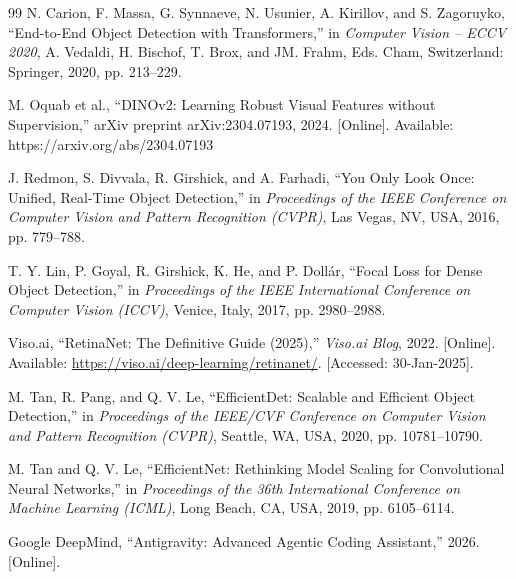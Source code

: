 \documentclass{article}
\begin{document}
\begin{thebibliography}{99}
    N. Carion, F. Massa, G. Synnaeve, N. Usunier, A. Kirillov, and S. Zagoruyko, ``End-to-End Object Detection with Transformers,'' in \textit{Computer Vision -- ECCV 2020}, A. Vedaldi, H. Bischof, T. Brox, and JM. Frahm, Eds. Cham, Switzerland: Springer, 2020, pp. 213--229.

    M. Oquab et al., ``DINOv2: Learning Robust Visual Features without Supervision,'' arXiv preprint arXiv:2304.07193, 2024. [Online]. Available: https://arxiv.org/abs/2304.07193

    J. Redmon, S. Divvala, R. Girshick, and A. Farhadi, ``You Only Look Once: Unified, Real-Time Object Detection,'' in \textit{Proceedings of the IEEE Conference on Computer Vision and Pattern Recognition (CVPR)}, Las Vegas, NV, USA, 2016, pp. 779--788.

    T. Y. Lin, P. Goyal, R. Girshick, K. He, and P. Doll\'{a}r, ``Focal Loss for Dense Object Detection,'' in \textit{Proceedings of the IEEE International Conference on Computer Vision (ICCV)}, Venice, Italy, 2017, pp. 2980--2988.

    Viso.ai, ``RetinaNet: The Definitive Guide (2025),'' \textit{Viso.ai Blog}, 2022. [Online]. Available: \url{https://viso.ai/deep-learning/retinanet/}. [Accessed: 30-Jan-2025].

    M. Tan, R. Pang, and Q. V. Le, ``EfficientDet: Scalable and Efficient Object Detection,'' in \textit{Proceedings of the IEEE/CVF Conference on Computer Vision and Pattern Recognition (CVPR)}, Seattle, WA, USA, 2020, pp. 10781--10790.

    M. Tan and Q. V. Le, ``EfficientNet: Rethinking Model Scaling for Convolutional Neural Networks,'' in \textit{Proceedings of the 36th International Conference on Machine Learning (ICML)}, Long Beach, CA, USA, 2019, pp. 6105--6114.


    Google DeepMind, ``Antigravity: Advanced Agentic Coding Assistant,'' 2026. [Online].

\end{thebibliography}
\end{document}
